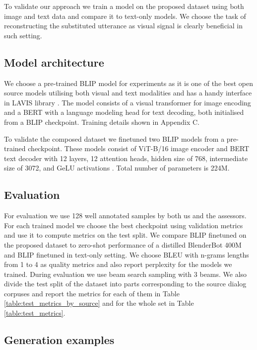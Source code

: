 To validate our approach we train a model on the proposed dataset using both image and text data and compare it to text-only models. We choose the task of reconstructing the substituted utterance as visual signal is clearly beneficial in such setting.

\subsection{Model architecture}

We choose a pre-trained BLIP \cite{blip} model for experiments as it is one of the best open source models utilising both visual and text modalities and has a handy interface in LAVIS library \cite{lavis}. The model consists of a visual transformer \cite{vit} for image encoding and a BERT \cite{bert} with a language modeling head for text decoding, both initialised from a BLIP checkpoint. Training details shown in Appendix C.

\medskip

To validate the composed dataset we finetuned two BLIP models from a pre-trained checkpoint. These models consist of ViT-B/16 image encoder and BERT text decoder with 12 layers, 12 attention heads, hidden size of 768, intermediate size of 3072, and GeLU activations \cite{gelu}. Total number of parameters is 224M.


\subsection{Evaluation}

For evaluation we use 128 well annotated samples by both us and the assessors. For each trained model we choose the best checkpoint using validation metrics and use it to compute metrics on the test split. We compare BLIP finetuned on the proposed dataset to zero-shot performance of a distilled BlenderBot 400M \cite{blenderbot} and BLIP finetuned in text-only setting. We choose BLEU \cite{bleu} with n-grams lengths from 1 to 4 as quality metrics and also report perplexity for the models we trained. During evaluation we use beam search sampling with 3 beams. We also divide the test split of the dataset into parts corresponding to the source dialog corpuses and report the metrics for each of them in Table \ref{table:test_metrics_by_source} and for the whole set in Table \ref{table:test_metrics}.

\subsection{Generation examples}

